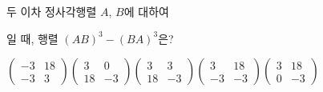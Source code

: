 \hspace*{2mm}\begin{minipage}[t]{\dimexpr\linewidth-2mm\relax}\vspace{0pt}
두 이차 정사각행렬 $A$, $B$에 대하여 \par\smallskip{}\par\smallskip\noindent 일 때, 행렬 $(AB)^3-(BA)^3$은?
\begin{choices32}{$\begin{pmatrix} -3 & 18 \\ -3 & 3 \end{pmatrix}$}{$\begin{pmatrix} 3 & 0 \\ 18 & -3 \end{pmatrix}$}{$\begin{pmatrix} 3 & 3 \\ 18 & -3 \end{pmatrix}$}{$\begin{pmatrix} 3 & 18 \\ -3 & -3 \end{pmatrix}$}{$\begin{pmatrix} 3 & 18 \\ 0 & -3 \end{pmatrix}$}\end{choices32}\end{minipage}
